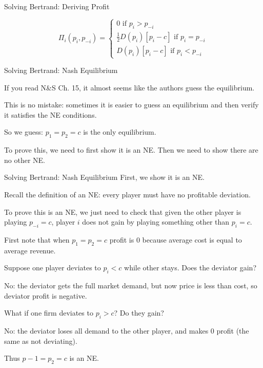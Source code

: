 \documentclass[aspectratio=169]{beamer}
\newenvironment{wideitemize}{\itemize\addtolength{\itemsep}{10pt}}{\enditemize}
\begin{document}
\begin{frame}{Solving Bertrand: Deriving Profit}

\[\Pi_i(p_i, p_{-i}) = \begin{cases} 0 \text{ if } p_i>p_{-i}\\
        \frac{1}{2}D(p_i) [p_i-c] \text{ if } p_i=p_{-i}\\
        D(p_i) [p_i-c] \text{ if } p_i<p_{-i}
        \end{cases}\]
    
\end{frame}

\begin{frame}{Solving Bertrand: Nash Equilibrium}

\begin{wideitemize}
    \item If you read N\&S Ch. 15, it almost seems like the authors guess the equilibrium.
    \item This is no mistake: sometimes it is easier to guess an equilibrium and then verify it satisfies the NE conditions.
    \item So we guess: $p_1=p_2=c$ is the only equilibrium.
    \item To prove this, we need to first show it is an NE. Then we need to show there are no other NE.
\end{wideitemize}

\end{frame}

\begin{frame}{Solving Bertrand: Nash Equilibrium}
First, we show it is an NE.
\begin{wideitemize}
    \item Recall the definition of an NE: every player must have no profitable deviation.
    \item To prove this is an NE, we just need to check that given the other player is playing $p_{-i}=c$, player $i$ does not gain by playing something other than $p_i=c$.
    \item First note that when $p_1=p_2=c$ profit is 0 because average cost is equal to average revenue.
    \item Suppose one player deviates to $p_i<c$ while other stays. Does the deviator gain?
    \item No: the deviator gets the full market demand, but now price is less than cost, so deviator profit is negative.
    \item What if one firm deviates to $p_i>c$? Do they gain?
    \item No: the deviator loses all demand to the other player, and makes 0 profit (the same as not deviating).
    \item Thus $p-1=p_2=c$ is an NE.
\end{wideitemize}
\end{frame}
\end{document}
